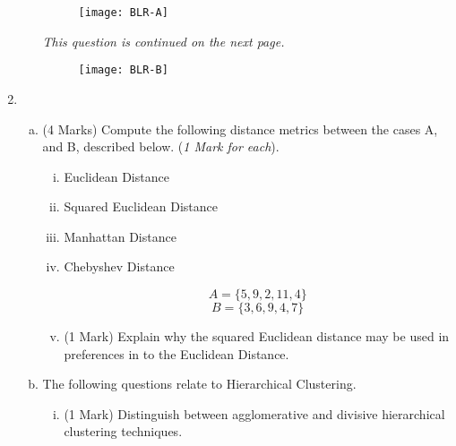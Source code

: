 \documentclass[a4paper,12pt]{article}
\begin{document}
\begin{enumerate}
\begin{enumerate}[(a)]
\begin{figure}[h!]
	\centering

\texttt{[image: BLR-A]}\\

\end{figure}

\noindent \textit{This question is continued on the next page.}
\begin{figure}[h!]
	\centering

	\texttt{[image: BLR-B]}\\
	
\end{figure}
\end{enumerate}
\newpage


	\item 
	\begin{enumerate}[(a)]
		\item (4 Marks)  Compute the following distance metrics between the cases A, and B, described below. (\textit{1 Mark for each}).
		\begin{enumerate}[(i)]
		\item Euclidean Distance
		\item Squared Euclidean Distance
		\item Manhattan Distance
		\item Chebyshev Distance
		
	
		\[ A = \{5,9,2,11,4\}\]
		\[ B = \{3,6,9,4,7\}\]
		\item (1 Mark) Explain why the squared Euclidean distance may be used in preferences in to the Euclidean Distance.
	\end{enumerate}



\bigskip 
\item The following questions relate to Hierarchical Clustering.


\begin{enumerate}[(i)]
\item (1 Mark) Distinguish between agglomerative and divisive hierarchical clustering techniques.
	

\end{enumerate}
\end{enumerate}
\end{enumerate}
\end{document}
